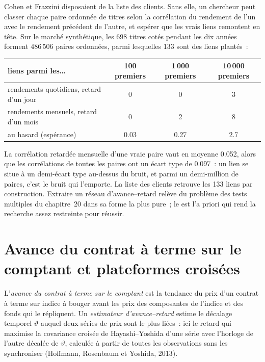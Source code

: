 Cohen et Frazzini disposaient de la liste des clients. Sans elle, un chercheur peut classer chaque paire ordonnée de titres selon la corrélation
du rendement de l'un avec le rendement précédent de l'autre, et espérer que les vrais liens remontent en tête. Sur le marché synthétique, les 698 titres
cotés pendant les dix années forment 486\,506 paires ordonnées, parmi lesquelles 133 sont des liens plantés~:

\begin{center}
\small
\begin{tabular}{@{}lccc@{}}
\toprule
liens parmi les\ldots & 100 premiers & 1\,000 premiers & 10\,000 premiers\\
\midrule
rendements quotidiens, retard d'un jour & 0 & 0 & 3\\
rendements mensuels, retard d'un mois & 0 & 2 & 8\\
au hasard (espérance) & 0.03 & 0.27 & 2.7\\
\bottomrule
\end{tabular}
\end{center}

La corrélation retardée mensuelle d'une vraie paire vaut en moyenne 0.052, alors que les corrélations de toutes les paires ont un écart type de 0.097~: un
lien se situe à un demi-écart type au-dessus du bruit, et parmi un demi-million de paires, c'est le bruit qui l'emporte. La liste des clients retrouve les 133
liens par construction. Extraire un réseau d'avance--retard relève du problème des tests multiples du chapitre~20 dans sa forme la plus pure~; le  est
l'a priori qui rend la recherche assez restreinte pour réussir.

\section{Avance du contrat à terme sur le comptant et plateformes croisées}

\begin{definition}\label{def:rs:cross-sectional-and-cross-asset-features:estimator}
L'\emph{avance du contrat à terme sur le comptant} est la tendance du prix d'un contrat à terme sur indice à bouger avant les prix
des composantes de l'indice et des fonds qui le répliquent. Un \emph{estimateur d'avance--retard} estime le
décalage temporel $\vartheta$ auquel deux séries de prix sont le plus liées~: ici le retard qui maximise la covariance croisée de Hayashi--Yoshida
d'une série avec l'horloge de l'autre décalée de $\vartheta$, calculée à partir de toutes les observations sans les synchroniser (Hoffmann,
Rosenbaum et Yoshida, 2013).
\end{definition}

